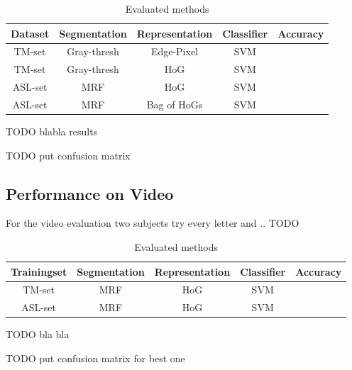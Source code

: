 \documentclass[letterpaper, 10 pt, conference]{ieeeconf}  %
\begin{document}
\begin{table}[h]
\caption{Evaluated methods}
\label{tab:eval-methods}
\begin{center}
\begin{tabular}{c|c|c|c|c}
Dataset & Segmentation & Representation & Classifier & Accuracy \\
\hline
\hline
TM-set & Gray-thresh & Edge-Pixel & SVM &\\
TM-set & Gray-thresh & HoG & SVM &\\
ASL-set & MRF & HoG & SVM &\\
ASL-set & MRF & Bag of HoGs & SVM & \\
\hline
\end{tabular}
\end{center}
\end{table}

TODO blabla results

TODO put confusion matrix

\subsection{Performance on Video}

For the video evaluation two subjects try every letter and .. TODO

\begin{table}[h]
\caption{Evaluated methods}
\label{tab:eval-methods}
\begin{center}
\begin{tabular}{c|c|c|c|c}
Trainingset & Segmentation & Representation & Classifier & Accuracy \\
\hline
\hline
TM-set & MRF & HoG & SVM &\\
ASL-set & MRF & HoG & SVM &\\
\hline
\end{tabular}
\end{center}
\end{table}

TODO bla bla

TODO put confusion matrix for best one
\end{document}
